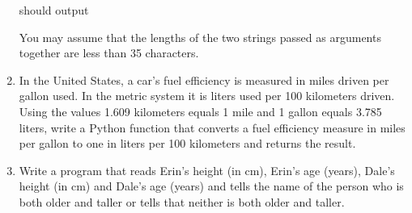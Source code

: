 \documentclass[letterpaper,10pt,english]{sphinxmanual}
\begin{document}
\begin{enumerate}
should output

%
\begin{sphinxVerbatim}[commandchars=\\\{\}]
  
\end{sphinxVerbatim}

You may assume that the lengths of the two strings passed as arguments
together are less than 35 characters.

\item {} 
In the United States, a car’s fuel efficiency is measured in
miles driven per gallon used.  In the metric system it is liters
used per 100 kilometers driven.  Using the values 1.609 kilometers
equals 1 mile and 1 gallon equals 3.785 liters, write a Python
function that converts a fuel efficiency measure in miles per gallon
to one in liters per 100 kilometers and returns the result.

\item {} 
Write a program that reads Erin’s height (in cm), Erin’s age (years),
Dale’s height (in cm) and Dale’s age (years) and tells the name of
the person who is both older and taller or tells that neither is
both older and taller.

\end{enumerate}
\end{document}
